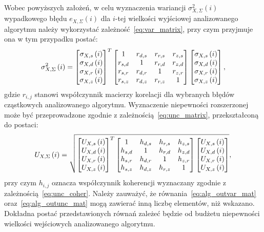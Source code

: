 Wobec powyższych założeń, w celu wyznaczenia wariancji $\sigma_{X,\Sigma}^{2}(i)$ wypadkowego błędu $e_{X,\Sigma}(i)$ dla $i$-tej wielkości wyjściowej analizowanego algorytmu należy wykorzystać zależność~\eqref{eq:var_matrix}, przy czym przyjmuje ona w tym przypadku postać:
\begin{equation}
\sigma_{X,\Sigma}^{2} \left(i\right) =
\begin{bmatrix}
\sigma_{X,s} \left(i\right) \\ \sigma_{X,d} \left(i\right) \\ \sigma_{X,r} \left(i\right) \\ \sigma_{X,z} \left(i\right)
\end{bmatrix}^{T}
\begin{bmatrix}
1         & r_{d,s} & r_{r,s} & r_{z,s} \\
r_{s,d}   & 1       & r_{r,d} & r_{z,d} \\
r_{s,r}   & r_{d,r} & 1       & r_{z,r} \\
r_{s,z}   & r_{d,z} & r_{r,z} & 1
\end{bmatrix}
\begin{bmatrix}
\sigma_{X,s} \left(i\right) \\ \sigma_{X,d} \left(i\right) \\ \sigma_{X,r} \left(i\right) \\ \sigma_{X,z} \left(i\right)
\end{bmatrix}
\label{eq:alg_outvar_mat},
\end{equation}
gdzie $r_{i,j}$ stanowi współczynnik macierzy korelacji dla wybranych błędów cząstkowych analizowanego algorytmu. Wyznaczenie niepewności rozszerzonej może być przeprowadzone zgodnie z zależnością~\eqref{eq:unc_matrix}, przekształconą do postaci:
\begin{equation}
U_{X,\Sigma} \left(i\right) = \sqrt{
\begin{bmatrix}
U_{X,s} \left(i\right) \\ U_{X,d} \left(i\right) \\ U_{X,r} \left(i\right) \\ U_{X,z} \left(i\right)
\end{bmatrix}^{T}
\begin{bmatrix}
1         & h_{d,s} & h_{r,s} & h_{z,s} \\
h_{s,d}   & 1       & h_{r,d} & h_{z,d} \\
h_{s,r}   & h_{d,r} & 1       & h_{z,r} \\
h_{s,z}   & h_{d,z} & h_{r,z} & 1
\end{bmatrix}
\begin{bmatrix}
U_{X,s} \left(i\right) \\ U_{X,d} \left(i\right) \\ U_{X,r} \left(i\right) \\ U_{X,z} \left(i\right)
\end{bmatrix}}
\label{eq:alg_outunc_mat},
\end{equation}
przy czym $h_{i,j}$ oznacza współczynnik koherencji wyznaczany zgodnie z zależnością~\eqref{eq:unc_coher}. Należy zauważyć, że równania~\eqref{eq:alg_outvar_mat} oraz~\eqref{eq:alg_outunc_mat} mogą zawierać inną liczbę elementów, niż wskazano. Dokładna postać przedstawionych równań zależeć będzie od budżetu niepewności wielkości wejściowych analizowanego algorytmu.

